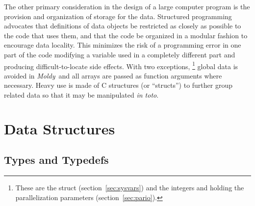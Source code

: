 \documentclass[a4paper,twoside]{report}
\newcommand{\moldy}{\emph{Moldy}}
\begin{document}
The other primary consideration in the design of a large computer
program is the provision and organization of storage for the data.
Structured programming advocates that definitions of data objects be
restricted as closely as possible to the code that uses them, and that
the code be organized in a modular fashion to encourage data locality.
This minimizes the risk of a programming error in one part of the code
modifying a variable used in a completely different part and producing
difficult-to-locate side effects.  With two exceptions,%
\footnote{These are the struct 
  (section~\ref{sec:sysvars}) and the integers  and
   holding the parallelization parameters
  (section~\ref{sec:pario}).} global data is avoided in \moldy\ and
all arrays are passed as function arguments where necessary.  Heavy
use is made of C structures (or ``structs'') to further group related
data so that it may be manipulated \emph{in toto}.

\section{Data Structures}%
 
\subsection{Types and Typedefs}
\label{sec:types}
\end{document}
